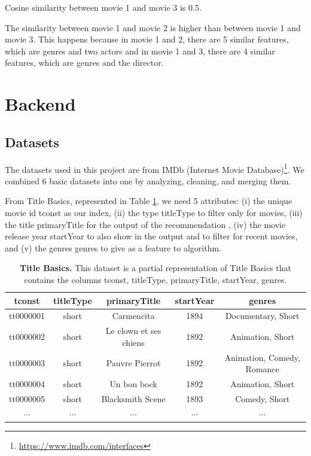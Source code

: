 Cosine similarity between movie 1 and movie 3 is 0.5.

The similarity between movie 1 and movie 2 is higher than between movie 1 and movie 3. This happens because in movie 1 and 2, there are 5 similar features, which are genres and two actors and in movie 1 and 3, there are 4 similar features, which are genres and the director.


\section{Backend}

\subsection{Datasets}

The datasets used in this project are from IMDb (Internet Movie Database)\footnote{\href{https://www.imdb.com/interfaces}{https://www.imdb.com/interfaces}}. We combined 6 basic datasets into one by analyzing, cleaning, and merging them.

From Title Basics, represented in Table \ref{tab:basics}, we need 5 attributes: (i) the unique movie id tconst as our index, (ii) the type titleType to filter only for movies, (iii) the title primaryTitle for the output of the recommendation , (iv) the movie release year startYear to also show in the output and to filter for recent movies, and (v) the genres genres to give as a feature to algorithm. 

\begin{table}[ht]
	\centering
	\caption{\textbf{Title Basics.} This dataset is a partial representation of Title Basics that contains the columns tconst, titleType, primaryTitle, startYear, genres.}
	\footnotesize
	\begin{tabular}{ccccc}
		\toprule
		tconst    & titleType & primaryTitle           & startYear & genres                     \\
		\midrule
		tt0000001 & short     & Carmencita             & 1894      & Documentary, Short         \\
		tt0000002 & short     & Le clown et ses chiens & 1892      & Animation, Short           \\
		tt0000003 & short     & Pauvre Pierrot         & 1892      & Animation, Comedy, Romance \\
		tt0000004 & short     & Un bon bock            & 1892      & Animation, Short           \\		
		tt0000005 & short     & Blacksmith Scene       & 1893      & Comedy, Short              \\
		$\cdots$  & $\cdots$  & $\cdots$               & $\cdots$  & $\cdots$                   \\
		\bottomrule
	\end{tabular}	
 	\label{tab:basics}
\end{table}

